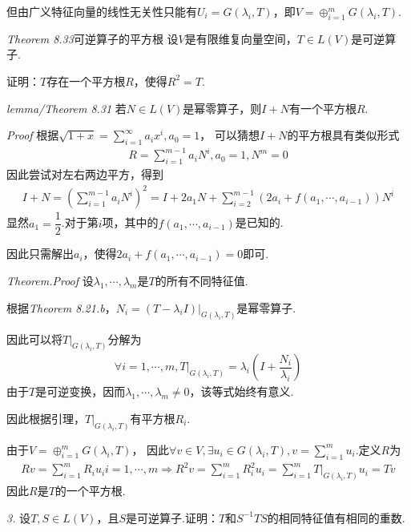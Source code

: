 但由广义特征向量的线性无关性只能有\(U_i=G(\lambda_i,T)\)，即\(V=\oplus_{i=1}^m G(\lambda_i,T)\).

\newpage

\textit{Theorem 8.33}{\kaishu 可逆算子的平方根}
设\(V\)是有限维复向量空间，\(T \in L(V)\)是可逆算子.

证明：\(T\)存在一个平方根\(R\)，使得\(R^2=T\).

\textit{lemma/Theorem 8.31}
若\(N \in L(V)\)是幂零算子，则\(I+N\)有一个平方根\(R\).

\textit{Proof}
根据\(\sqrt{1+x}=\sum_{i=1}^\infty a_ix^i,a_0=1\)，
可以猜想\(I+N\)的平方根具有类似形式
    \begin{align*}
        R=\sum_{i=1}^{m-1} a_iN^i,a_0=1,N^m=0
    \end{align*}
因此尝试对左右两边平方，得到
    \begin{align*}
        I+N = (\sum_{i=1}^{m-1} a_iN^i)^2 
            = I+2a_1N+\sum_{i=2}^{m-1} (2a_i+f(a_1,\cdots,a_{i-1}))N^i
    \end{align*}
显然\(a_1=\dfrac{1}{2}\).对于第\(i\)项，其中的\(f(a_1,\cdots,a_{i-1})\)是已知的.

因此只需解出\(a_i\)，使得\(2a_i+f(a_1,\cdots,a_{i-1})=0\)即可.

\textit{Theorem.Proof}
设\(\lambda_1,\cdots,\lambda_m\)是\(T\)的所有不同特征值.

根据\textit{Theorem 8.21.b}，\(N_i=(T-\lambda_i I)|_{G(\lambda_i,T)}\)是幂零算子.

因此可以将\(T|_{G(\lambda_i,T)}\)分解为
    \begin{align*}
        \forall i=1,\cdots,m,T|_{G(\lambda_i,T)}=\lambda_i(I+\dfrac{N_i}{\lambda_i})
    \end{align*}
由于\(T\)是可逆变换，因而\(\lambda_1,\cdots,\lambda_m \ne 0\)，该等式始终有意义.

因此根据引理，\(T|_{G(\lambda_i,T)}\)有平方根\(R_i\).

由于\(V=\oplus_{i=1}^m G(\lambda_i,T)\)，
因此\(\forall v \in V,\exists u_i \in G(\lambda_i,T),v=\sum_{i=1}^m u_i\).定义\(R\)为
    \begin{align*}
        Rv=\sum_{i=1}^m R_iu_i i=1,\cdots,m \Rightarrow
        R^2v=\sum_{i=1}^m R_i^2 u_i=\sum_{i=1}^m T|_{G(\lambda_i,T)}u_i=Tv
    \end{align*}
因此\(R\)是\(T\)的一个平方根.

\newpage

\textit{3.}
设\(T,S \in L(V)\)，且\(S\)是可逆算子.证明：\(T\)和\(S^{-1}TS\)的相同特征值有相同的重数.

